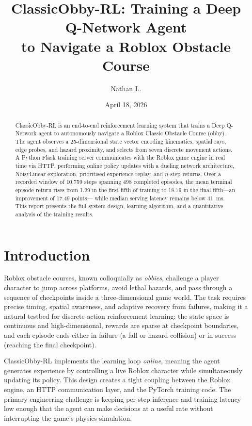 \documentclass[11pt]{article}
\title{%
  ClassicObby-RL: Training a Deep Q-Network Agent \\
  to Navigate a Roblox Obstacle Course
}
\author{Nathan L.}
\date{April 18, 2026}
\begin{document}
\maketitle

\begin{abstract}
ClassicObby-RL is an end-to-end reinforcement learning system that trains
a Deep Q-Network agent to autonomously navigate a Roblox Classic Obstacle
Course (obby). The agent observes a 25-dimensional state vector encoding
kinematics, spatial rays, edge probes, and hazard proximity, and selects
from seven discrete movement actions. A Python Flask training server
communicates with the Roblox game engine in real time via HTTP, performing
online policy updates with a dueling network architecture, NoisyLinear
exploration, prioritised experience replay, and $n$-step returns. Over a
recorded window of 10{,}759 steps spanning 498 completed episodes, the
mean terminal episode return rises from 1.29 in the first fifth of
training to 18.79 in the final fifth---an improvement of 17.49 points---
while median serving latency remains below \SI{41}{ms}. This report
presents the full system design, learning algorithm, and a quantitative
analysis of the training results.
\end{abstract}

\section{Introduction}
\label{sec:intro}

Roblox obstacle courses, known colloquially as \emph{obbies}, challenge a
player character to jump across platforms, avoid lethal hazards, and pass
through a sequence of checkpoints inside a three-dimensional game world.
The task requires precise timing, spatial awareness, and adaptive recovery
from failures, making it a natural testbed for discrete-action
reinforcement learning: the state space is continuous and
high-dimensional, rewards are sparse at checkpoint boundaries, and each
episode ends either in failure (a fall or hazard collision) or in success
(reaching the final checkpoint).

ClassicObby-RL implements the learning loop \emph{online}, meaning the
agent generates experience by controlling a live Roblox character while
simultaneously updating its policy. This design creates a tight coupling
between the Roblox engine, an HTTP communication layer, and the PyTorch
training code. The primary engineering challenge is keeping per-step
inference and training latency low enough that the agent can make
decisions at a useful rate without interrupting the game's physics
simulation.
\end{document}
